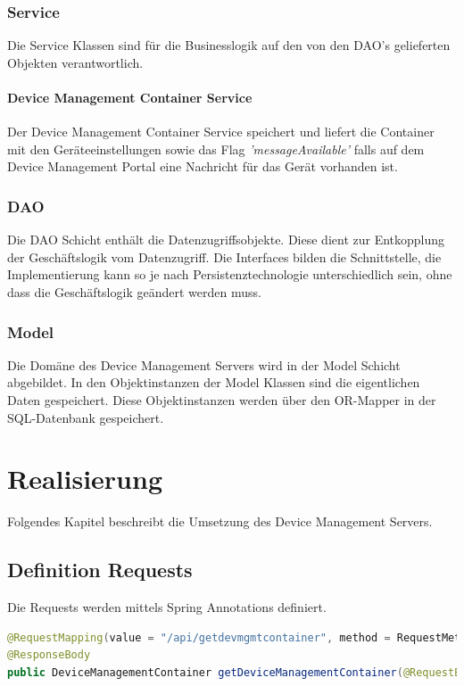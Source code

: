 \subsubsection{Service}
Die Service Klassen sind für die Businesslogik auf den von den DAO's gelieferten Objekten verantwortlich.

\paragraph{Device Management Container Service}
Der Device Management Container Service speichert und liefert die Container mit den Geräteeinstellungen sowie das Flag \textit{'messageAvailable'} falls auf dem Device Management Portal eine Nachricht für das Gerät vorhanden ist.

\subsubsection{DAO}
Die DAO Schicht enthält die Datenzugriffsobjekte. Diese dient zur Entkopplung der Geschäftslogik vom Datenzugriff. Die Interfaces bilden die Schnittstelle, die Implementierung kann so je nach Persistenztechnologie unterschiedlich sein, ohne dass die Geschäftslogik geändert werden muss.


\subsubsection{Model}
Die Domäne des Device Management Servers wird in der Model Schicht abgebildet. In den Objektinstanzen der Model Klassen sind die eigentlichen Daten gespeichert. Diese Objektinstanzen werden über den OR-Mapper in der SQL-Datenbank gespeichert.

\section{Realisierung}
Folgendes Kapitel beschreibt die Umsetzung des Device Management Servers.

\subsection{Definition Requests}
Die Requests werden mittels Spring Annotations definiert. 

\begin{lstlisting}[language=Java, caption=Spring Annotation]
@RequestMapping(value = "/api/getdevmgmtcontainer", method = RequestMethod.POST)
@ResponseBody
public DeviceManagementContainer getDeviceManagementContainer(@RequestBody final StatusData request)

\end{lstlisting}

